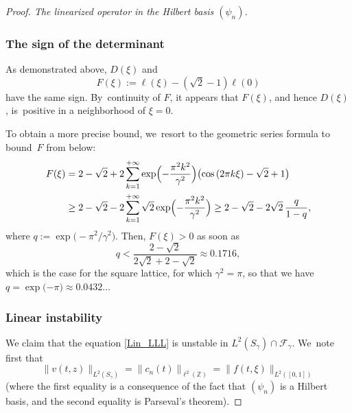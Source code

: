 \documentclass[10pt]{amsart}
\theoremstyle{definition}
\let\EE\exp
\newcommand{\pa}[1]{\left(#1\right)}
\newcommand{\bpa}[1]{\bigl(#1\bigr)}
\begin{document}
\begin{proof}[Proof. The linearized operator in the Hilbert basis $(\psi_n)$]
\subsubsection*{The sign of the determinant}
As demonstrated above, $D(\xi)$ and
\[
F(\xi):=\ell(\xi) -(\sqrt{2}-1)\ell(0)
\]
have the same sign. By~continuity of $F$, it appears that $F(\xi)$, and hence $D(\xi)$, is~positive in a neighborhood of $\xi=0$.

To obtain a more precise bound, we~resort to the geometric series formula to bound~$F$ from below:
\begin{align*}
F(\xi) &=2 - \sqrt{2} + 2 \sum_{k=1}^{+\infty}\EE\Bigl(-\frac{\pi^2 k^2}{\gamma^2}\Bigr) \bpa{\cos\pa{2\pi k\xi}-\sqrt{2}+1}\\
&\geq 2 - \sqrt{2} - 2 \sum_{k=1}^{+\infty}\sqrt{2}\EE\Bigl(-\frac{\pi^2 k^2}{\gamma^2}\Bigr) \geq 2 - \sqrt{2} - 2\sqrt{2}\,\frac{q}{1-q},
\end{align*}
where $q:= \EE\bigl(-{\pi^2}/{\gamma^2}\bigr)$. Then, $F(\xi) > 0$ as soon as
\[
q < \frac{2-\sqrt{2}}{2\sqrt{2}+2-\sqrt{2}} \approx 0.1716,
\]
which is the case for the square lattice, for which $\gamma^2 = \pi$, so that we have \linebreak ${q = \EE\bigl({-\pi} \bigr)\approx 0.0432\dots}$

\subsubsection*{Linear instability} We claim that the equation \eqref{Lin_LLL} is unstable in $L^2(S_\gamma) \cap \mathcal{F}_\gamma$. We~note first that
\[
\| v(t,z) \|_{L^2(S_\gamma)} = \| c_n(t) \|_{\ell^2(\mathbb{Z})} = \| f(t,\xi) \|_{L^2([0,1])}
\]
(where the first equality is a consequence of the fact that $(\psi_n)$ is a Hilbert basis, and the second equality is Parseval's theorem).


\end{proof}
\end{document}
